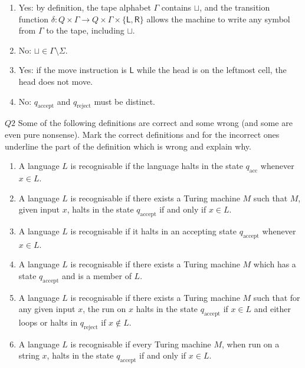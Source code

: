 \documentclass{article}
\theoremstyle{definition}
\theoremstyle{definition}
\theoremstyle{remark}
\begin{document}
\bigskip

\begin{enumerate}
    \item[$(i)$] Yes: by definition, the tape alphabet $\Gamma$ contains $\sqcup$, and the transition function $\delta:Q\times\Gamma\rightarrow Q\times\Gamma\times\{\mathsf{L},\mathsf{R}\}$ allows the machine to write any symbol from $\Gamma$ to the tape, including $\sqcup$.
    
    \item[$(ii)$] No: $\sqcup\in\Gamma\setminus\Sigma$.

    \item[$(iii)$] Yes: if the move instruction is $\mathsf{L}$ while the head is on the leftmost cell, the head does not move.

    \item[$(iv)$] No: $q_\text{accept}$ and $q_\text{reject}$ must be distinct.
\end{enumerate}


\begin{questionbox}{$Q2$}
    Some of the following definitions are correct and some wrong (and some are even pure nonsense). Mark the correct definitions and for the incorrect ones underline the part of the definition which is wrong and explain why.
    \begin{enumerate}
        \item[$(i)$] A language $L$ is recognisable if the language halts in the state $q_\text{acc}$ whenever $x\in L$.
        
        \item[$(ii)$] A language $L$ is recognisable if there exists a Turing machine $M$ such that $M$, given input $x$, halts in the state $q_\text{accept}$ if and only if $x\in L$.
    
        \item[$(iii)$] A language $L$ is recognisable if it halts in an accepting state $q_\text{accept}$ whenever $x\in L$.
    
        \item[$(iv)$] A language $L$ is recognisable if there exists a Turing machine $M$ which has a state $q_\text{accept}$ and is a member of $L$.
        
        \item[$(v)$] A language $L$ is recognisable if there exists a Turing machine $M$ such that for any given input $x$, the run on $x$ halts in the state $q_\text{accept}$ if $x\in L$ and either loops or halts in $q_\text{reject}$ if $x\notin L$.
        
        \item[$(vi)$] A language $L$ is recognisable if every Turing machine $M$, when run on a string $x$, halts in the state $q_\text{accept}$ if and only if $x\in L$.
    \end{enumerate}
\end{questionbox}
\end{document}
